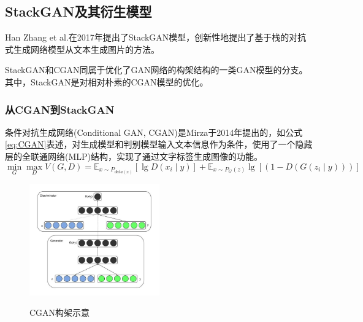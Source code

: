 \subsection{StackGAN及其衍生模型}
Han Zhang et al.在2017年提出了StackGAN模型，创新性地提出了基于栈的对抗式生成网络模型从文本生成图片的方法。

StackGAN和CGAN同属于优化了GAN网络的构架结构的一类GAN模型的分支。其中，StackGAN是对相对朴素的CGAN模型的优化。

\subsubsection{从CGAN到StackGAN}
条件对抗生成网络(Conditional GAN, CGAN)是Mirza于2014年提出的，如公式\eqref{eq:CGAN}表述，对生成模型和判别模型输入文本信息作为条件，使用了一个隐藏层的全联通网络(MLP)结构，实现了通过文字标签生成图像的功能。
\begin{equation}
  \min_G\max_DV(G,D)=\mathbb{E}_{x\sim P_{data(x)}}[\lg D(x_i\mid y)]+\mathbb{E}_{x\sim P_G(z)}\lg [(1−D(G(z_i\mid y)))]
  \label{eq:CGAN}
\end{equation}

\begin{figure}[!htb]
  \centering
  \includegraphics[width=0.5\textwidth]{figures/cgan.jpg}\\
  \caption{CGAN构架示意}
  \label{fig:CGAN}
\end{figure}

